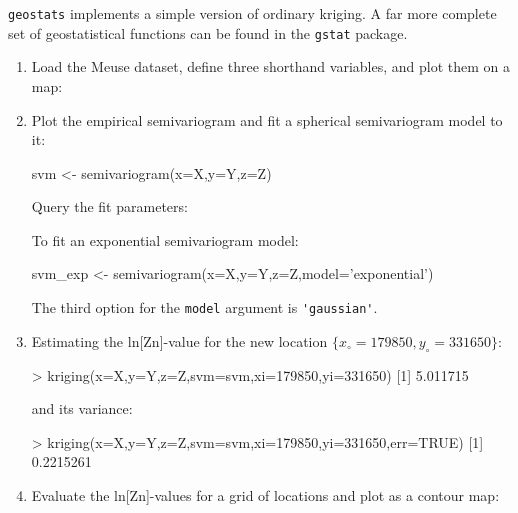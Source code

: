 \texttt{geostats} implements a simple version of ordinary kriging.  A
far more complete set of geostatistical functions can be found in the
\texttt{gstat} package.

\begin{enumerate}

\item Load the Meuse dataset, define three shorthand variables, and
  plot them on a map:


\item Plot the empirical semivariogram and fit a spherical
  semivariogram model to it:

\begin{script}[firstnumber=4]
svm <- semivariogram(x=X,y=Y,z=Z)
\end{script}

Query the fit parameters:


To fit an exponential semivariogram model:

\begin{script}[firstnumber=4]
svm_exp <- semivariogram(x=X,y=Y,z=Z,model='exponential')
\end{script}

The third option for the \texttt{model} argument is \verb|'gaussian'|.

\item Estimating the ln[Zn]-value for the new location
  $\{x_,y_\}$:

\begin{console}
> kriging(x=X,y=Y,z=Z,svm=svm,xi=179850,yi=331650)
[1] 5.011715
\end{console}

\noindent and its variance:

\begin{console}
> kriging(x=X,y=Y,z=Z,svm=svm,xi=179850,yi=331650,err=TRUE)
[1] 0.2215261
\end{console}

\item\label{it:R-meuse-contour} Evaluate the ln[Zn]-values for a grid
  of locations and plot as a contour map:


\end{enumerate}
